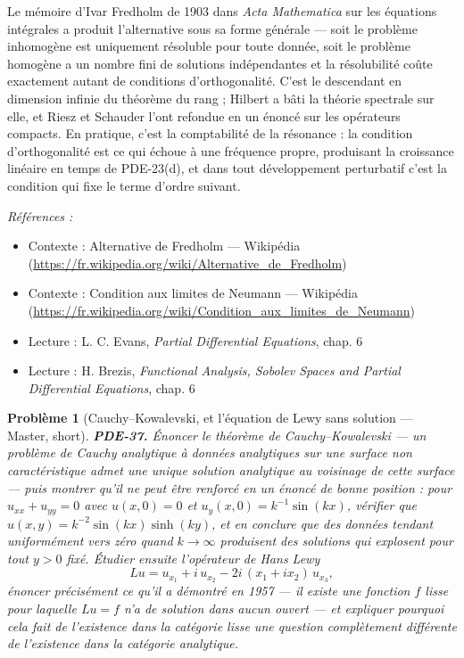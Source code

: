 \documentclass[11pt]{article}
\newtheorem{problem}{Problème}
\newenvironment{refs}{\par\small\noindent\emph{Références :}\begin{itemize}\setlength\itemsep{0pt}}{\end{itemize}\normalsize}
\begin{document}
\noindent Le mémoire d'Ivar Fredholm de 1903 dans \textit{Acta Mathematica} sur les
équations intégrales a produit l'alternative sous sa forme générale --- soit le problème
inhomogène est uniquement résoluble pour toute donnée, soit le problème homogène a un nombre fini
de solutions indépendantes et la résolubilité coûte exactement autant de conditions
d'orthogonalité. C'est le descendant en dimension infinie du théorème du rang ; Hilbert a bâti la
théorie spectrale sur elle, et Riesz et Schauder l'ont refondue en un énoncé sur les opérateurs
compacts. En pratique, c'est la comptabilité de la résonance : la condition d'orthogonalité est ce
qui échoue à une fréquence propre, produisant la croissance linéaire en temps de PDE-23(d), et dans
tout développement perturbatif c'est la condition qui fixe le terme d'ordre suivant.

\begin{refs}
\item Contexte : Alternative de Fredholm --- Wikipédia (\url{https://fr.wikipedia.org/wiki/Alternative_de_Fredholm})
\item Contexte : Condition aux limites de Neumann --- Wikipédia (\url{https://fr.wikipedia.org/wiki/Condition_aux_limites_de_Neumann})
\item Lecture : L. C. Evans, \textit{Partial Differential Equations}, chap. 6
\item Lecture : H. Brezis, \textit{Functional Analysis, Sobolev Spaces and Partial Differential Equations}, chap. 6
\end{refs}

\bigskip

\begin{problem}[{Cauchy--Kowalevski, et l'équation de Lewy sans solution --- Master, short}]
\textbf{PDE-37.} Énoncer le théorème de Cauchy--Kowalevski --- un problème de
Cauchy analytique à données analytiques sur une surface non caractéristique admet une unique
solution analytique au voisinage de cette surface --- puis montrer qu'il ne peut être renforcé en un
énoncé de bonne position : pour $u_{xx} + u_{yy} = 0$ avec $u(x,0) = 0$ et
$u_y(x,0) = k^{-1}\sin(kx)$, vérifier que $u(x,y) = k^{-2}\sin(kx)\sinh(ky)$, et en conclure
que des données tendant uniformément vers zéro quand $k \to \infty$ produisent des solutions qui
explosent pour tout $y > 0$ fixé. Étudier ensuite l'opérateur de Hans Lewy
\[ Lu = u_{x_1} + i\,u_{x_2} - 2i\,(x_1 + i x_2)\,u_{x_3}, \]
énoncer précisément ce qu'il a démontré en 1957 --- il existe une fonction $f$ lisse pour laquelle
$Lu = f$ n'a de solution dans aucun ouvert --- et expliquer pourquoi cela fait de l'existence dans
la catégorie lisse une question complètement différente de l'existence dans la catégorie
analytique.
\end{problem}
\end{document}
